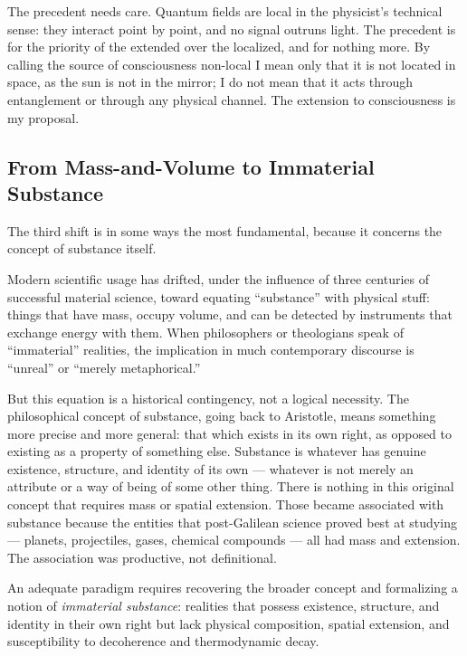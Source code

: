 The precedent needs care. Quantum fields are local in the physicist's technical
sense: they interact point by point, and no signal outruns light. The
precedent is for the priority of the extended over the localized, and for
nothing more. By calling the source of consciousness non-local I mean only that
it is not located in space, as the sun is not in the mirror; I do not mean that
it acts through entanglement or through any physical channel. The extension to
consciousness is my proposal.


\subsection{From Mass-and-Volume to Immaterial Substance}
\label{subsec:immaterial-substance}

The third shift is in some ways the most fundamental, because it concerns the
concept of substance itself.

Modern scientific usage has drifted, under the influence of three centuries of
successful material science, toward equating ``substance'' with physical stuff:
things that have mass, occupy volume, and can be detected by instruments that
exchange energy with them. When
philosophers or theologians speak of ``immaterial'' realities, the implication
in much contemporary discourse is ``unreal'' or ``merely metaphorical.''

But this equation is a historical contingency, not a logical necessity. The
philosophical concept of substance, going back to Aristotle, means something
more precise and more general: that which exists in its own right, as opposed
to existing as a property of something else. Substance is whatever has genuine
existence, structure, and identity of its own --- whatever is not merely an
attribute or a way of being of some other thing. There is nothing in this
original concept that requires mass or spatial extension. Those became associated
with substance because the entities that post-Galilean science proved best at
studying --- planets, projectiles, gases, chemical compounds --- all had mass and
extension. The association was productive, not definitional.

An adequate paradigm requires recovering the broader concept and formalizing a
notion of \emph{immaterial substance}: realities that possess existence,
structure, and identity in their own right but lack physical composition,
spatial extension, and susceptibility to decoherence and thermodynamic decay.

